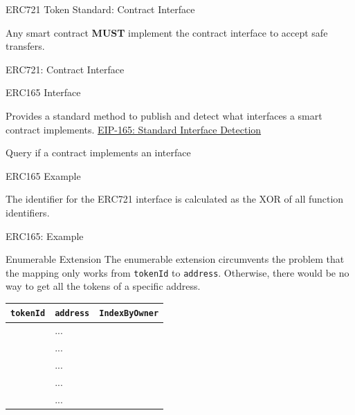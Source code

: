 \documentclass[handout]{beamer}
\begin{document}
\begin{frame}{ERC721 Token Standard: Contract Interface}

Any smart contract \textbf{MUST} implement the contract interface to accept safe transfers.
\vspace{1em}
	\begin{samplecode}{ERC721: Contract Interface}
		
	\end{samplecode}
\end{frame}

\begin{frame}{ERC165 Interface}

Provides a standard method to publish and detect what interfaces a smart contract implements. \link \href{https://eips.ethereum.org/EIPS/eip-165}{EIP-165: Standard Interface Detection}
\vspace{1em}
	\begin{samplecode}{Query if a contract implements an interface}
			
	\end{samplecode}
\end{frame}


\begin{frame}{ERC165 Example}

The identifier for the ERC721 interface is calculated as the XOR of all function identifiers.
\vspace{0.5em}
\begin{samplecode}{ERC165: Example}
		
\end{samplecode}
\end{frame}

\begin{frame}{Enumerable Extension}
The enumerable extension circumvents the problem that the mapping only works from \texttt{tokenId} to \texttt{address}. Otherwise, there would be no way to get all the tokens of a specific address.
\vspace{0.5em}
		\begin{table}
			\begin{tabular}{clc}
			\hline \hline
			\texttt{tokenId} & \texttt{address} & \texttt{IndexByOwner}\\
			\hline
			\color{focus}{0} & \color{focus}{0x0901}... & \color{focus}{0} \\
			\color{mint}{1} & \color{mint}{0x7A25}... & \color{mint}{0} \\
			\color{focus}{2} & \color{focus}{0x0901}... & \color{focus}{1}\\
			\color{focus}{3} & \color{focus}{0x0901}... & \color{focus}{2}\\
			\color{darkmint}{4} & \color{darkmint}{0xce9b}... & \color{darkmint}{0} \\
			\hline \hline
			\end{tabular}
		\end{table}
\end{frame}
\end{document}
